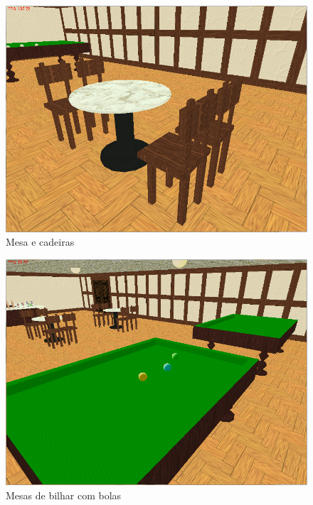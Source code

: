 \documentclass[a5paper,onecolumn, 11pt]{article}
\begin{document}
\begin{figure}[!htb]
    \centering
    \includegraphics[scale=0.5]{bar3.png}
    \caption{Mesa e cadeiras}
\end{figure}
\begin{figure}[!htb]
    \centering
    \includegraphics[scale=0.5]{bar4.png}
    \caption{Mesas de bilhar com bolas}
\end{figure}
\end{document}

